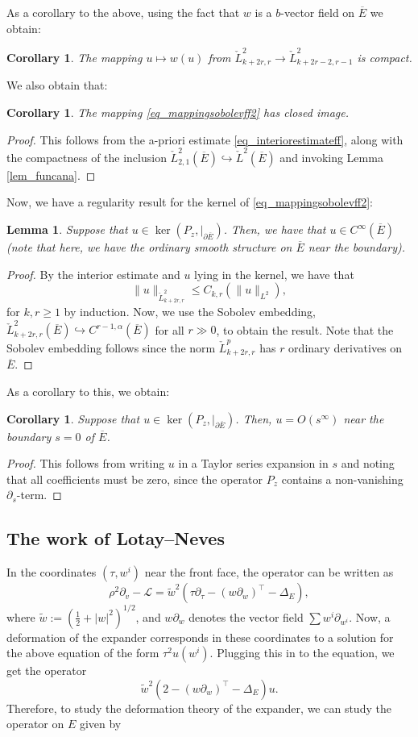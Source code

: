 \documentclass[10pt, a4paper]{article}
\theoremstyle{plain}%
\newtheorem{lem}[theorem]{Lemma}
\newtheorem{coro}[theorem]{Corollary}
\theoremstyle{definition}
\numberwithin{figure}{section}
\numberwithin{equation}{section}
\newcommand{\pa}{\partial}
\newcommand{\rt}{\rightarrow}
\newcommand{\cL}{\mathcal{L}}
\newcommand{\oE}{{\overline{E}}}
\newcommand{\chL}{\check{L}}
\newcommand{\tw}{\tilde{w}}
\begin{document}
As a corollary to the above, using the fact that $w$ is a $b$-vector field on $\oE$ we obtain:	\begin{coro}\label{lem_compactfield}
	The mapping $u\mapsto w(u)$ from $\chL^2_{k+2r,r} \rt \chL^2_{k+2r-2,r-1}$ is compact.
\end{coro}
We also obtain that:
\begin{coro}\label{coro_closedimageE}
	The mapping \eqref{eq_mappingsobolevff2} has closed image.
\end{coro}
\begin{proof}
	This follows from the a-priori estimate \eqref{eq_interiorestimateff}, along with the compactness of the inclusion $\chL^2_{2,1}(\oE)\hookrightarrow \chL^2(\oE)$ and invoking Lemma \ref{lem_funcana}.
\end{proof}


Now, we have a regularity result for the kernel of \eqref{eq_mappingsobolevff2}:
\begin{lem}\label{lem_regularityE}
	Suppose that $u\in \ker(P_z,|_{\pa\oE})$. Then, we have that $u\in C^\infty(\oE)$ (note that here, we have the ordinary smooth structure on $\oE$ near the boundary).
\end{lem}
\begin{proof}
	By the interior estimate and $u$ lying in the kernel, we have that \[
	\|u\|_{\chL^2_{k+2r,r}} \leq C_{k,r}(\|u\|_{L^2}), 
	\]
	for $k,r\geq1$ by induction.
	Now, we use the Sobolev embedding, $\chL^2_{k+2r,r}(\oE) \hookrightarrow C^{r-1,\alpha}(\oE)$ for all $r\gg 0$, to obtain the result. Note that the Sobolev embedding follows since the norm $\chL^p_{k+2r,r}$ has $r$ ordinary derivatives on $\oE$.
\end{proof}
As a corollary to this, we obtain:

\begin{coro}\label{coro_zerokernel}
	Suppose that $u\in \ker(P_z, |_{\pa\oE})$. Then, $u=O(s^\infty)$ near the boundary $s=0$ of $\oE$. 
\end{coro}
\begin{proof}
	This follows from writing $u$ in a Taylor series expansion in $s$ and noting that all coefficients must be zero, since the operator $P_z$ contains a non-vanishing $\pa_s$-term.
\end{proof}


\subsection{The work of Lotay--Neves}\label{subsec_LN}
In the coordinates $(\tau,w^i)$ near the front face, the operator can be written as \[
\rho^2\pa_v - \cL = \tw^2(\tau\pa_\tau - (w\pa_w)^\top -\Delta_E),
\]
 where $\tw := (\frac{1}{2}+|w|^2)^{1/2}$, and $w\pa_w$ denotes the vector field $\sum w^i\pa_{w^i}$.
Now, a deformation of the expander corresponds in these coordinates to a solution for the above equation of the form $\tau^2 u(w^i)$. Plugging this in to the equation, we get the operator \[
\tw^2(2- (w\pa_w)^\top -\Delta_E)u.
\]
 Therefore, to study the deformation theory of the expander, we can study the operator on $E$ given by 
\end{document}

